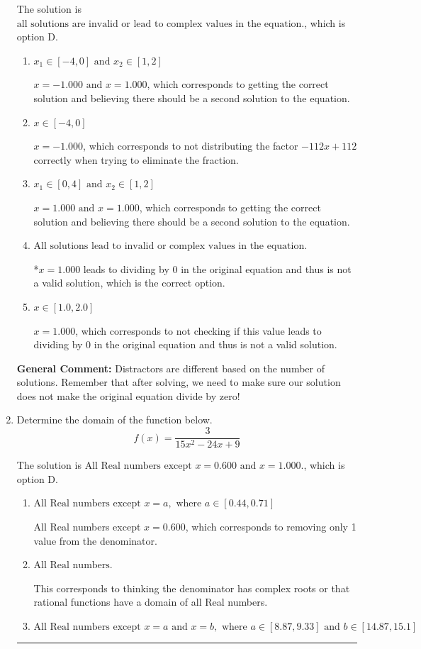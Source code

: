 \documentclass{extbook}[14pt]
\newcommand{\litem}[1]{\item #1

\rule{\textwidth}{0.4pt}}
\begin{document}
\begin{enumerate}
{The solution is \( \text{all solutions are invalid or lead to complex values in the equation.} \), which is option D.\begin{enumerate}[label=\Alph*.]
\item \( x_1 \in [-4, 0] \text{ and } x_2 \in [1,2] \)

$x = -1.000 \text{ and } x = 1.000$, which corresponds to getting the correct solution and believing there should be a second solution to the equation.
\item \( x \in [-4,0] \)

$x = -1.000$, which corresponds to not distributing the factor $-112x + 112$ correctly when trying to eliminate the fraction.
\item \( x_1 \in [0, 4] \text{ and } x_2 \in [1,2] \)

$x = 1.000 \text{ and } x = 1.000$, which corresponds to getting the correct solution and believing there should be a second solution to the equation.
\item \( \text{All solutions lead to invalid or complex values in the equation.} \)

*$x = 1.000$ leads to dividing by 0 in the original equation and thus is not a valid solution, which is the correct option.
\item \( x \in [1.0,2.0] \)

$x = 1.000$, which corresponds to not checking if this value leads to dividing by 0 in the original equation and thus is not a valid solution.
\end{enumerate}

\textbf{General Comment:} Distractors are different based on the number of solutions. Remember that after solving, we need to make sure our solution does not make the original equation divide by zero!
}
\litem{
Determine the domain of the function below.
\[ f(x) = \frac{3}{15x^{2} -24 x + 9} \]

The solution is \( \text{All Real numbers except } x = 0.600 \text{ and } x = 1.000. \), which is option D.\begin{enumerate}[label=\Alph*.]
\item \( \text{All Real numbers except } x = a, \text{ where } a \in [0.44, 0.71] \)

All Real numbers except $x = 0.600$, which corresponds to removing only 1 value from the denominator.
\item \( \text{All Real numbers.} \)

This corresponds to thinking the denominator has complex roots or that rational functions have a domain of all Real numbers.
\item \( \text{All Real numbers except } x = a \text{ and } x = b, \text{ where } a \in [8.87, 9.33] \text{ and } b \in [14.87, 15.1] \)


\end{enumerate}}
\end{enumerate}
\end{document}

